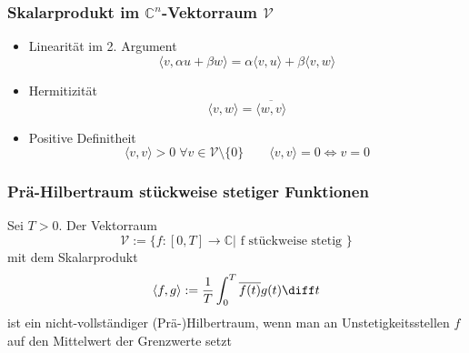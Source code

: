 \begin{emphbox}
    \subsubsection{Skalarprodukt im $\mathbb C^n$-Vektorraum $\mathcal V$}
    \begin{itemize}
        \item Linearität im 2. Argument \begin{equation*}
                  \langle v, \alpha u + \beta w\rangle = \alpha\langle v,u\rangle + \beta\langle v,w\rangle
              \end{equation*}
        \item Hermitizität \begin{equation*}
                  \langle v,w\rangle = \overline{\langle w,v\rangle}
              \end{equation*}
        \item Positive Definitheit \begin{equation*}
                  \langle v,v\rangle > 0 \; \forall v\in\mathcal{V}\setminus\{0\} \qquad \langle v,v\rangle = 0 \Leftrightarrow v=0
              \end{equation*}
    \end{itemize}
\end{emphbox}

\begin{emphbox}
    \subsubsection{Prä-Hilbertraum stückweise stetiger Funktionen}
    Sei $T>0$. Der Vektorraum
    \begin{equation*}
        \mathcal V := \{f:[0,T]\rightarrow \mathbb C | \text{ f stückweise stetig }\}
    \end{equation*}
    mit dem Skalarprodukt
    \begin{equation*}
        \langle f, g\rangle := \frac{1}{T}\int_0^T \overline{f(t)}g(t) \diff t
    \end{equation*}
    ist ein nicht-vollständiger (Prä-)Hilbertraum, wenn man an Unstetigkeitsstellen $f$ auf den Mittelwert der Grenzwerte setzt
\end{emphbox}


